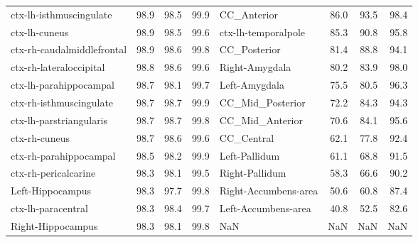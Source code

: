 \begin{tabular}{lrrrlrrr}
ctx-lh-isthmuscingulate & 98.9 & 98.5 & 99.9 & CC\_Anterior & 86.0 & 93.5 & 98.4 \\
ctx-lh-cuneus & 98.9 & 98.5 & 99.6 & ctx-lh-temporalpole & 85.3 & 90.8 & 95.8 \\
ctx-rh-caudalmiddlefrontal & 98.9 & 98.6 & 99.8 & CC\_Posterior & 81.4 & 88.8 & 94.1 \\
ctx-rh-lateraloccipital & 98.8 & 98.6 & 99.6 & Right-Amygdala & 80.2 & 83.9 & 98.0 \\
ctx-lh-parahippocampal & 98.7 & 98.1 & 99.7 & Left-Amygdala & 75.5 & 80.5 & 96.3 \\
ctx-rh-isthmuscingulate & 98.7 & 98.7 & 99.9 & CC\_Mid\_Posterior & 72.2 & 84.3 & 94.3 \\
ctx-lh-parstriangularis & 98.7 & 98.7 & 99.8 & CC\_Mid\_Anterior & 70.6 & 84.1 & 95.6 \\
ctx-rh-cuneus & 98.7 & 98.6 & 99.6 & CC\_Central & 62.1 & 77.8 & 92.4 \\
ctx-rh-parahippocampal & 98.5 & 98.2 & 99.9 & Left-Pallidum & 61.1 & 68.8 & 91.5 \\
ctx-rh-pericalcarine & 98.3 & 98.1 & 99.5 & Right-Pallidum & 58.3 & 66.6 & 90.2 \\
Left-Hippocampus & 98.3 & 97.7 & 99.8 & Right-Accumbens-area & 50.6 & 60.8 & 87.4 \\
ctx-lh-paracentral & 98.3 & 98.4 & 99.7 & Left-Accumbens-area & 40.8 & 52.5 & 82.6 \\
Right-Hippocampus & 98.3 & 98.1 & 99.8 & NaN & NaN & NaN & NaN \\
\bottomrule
\end{tabular}
